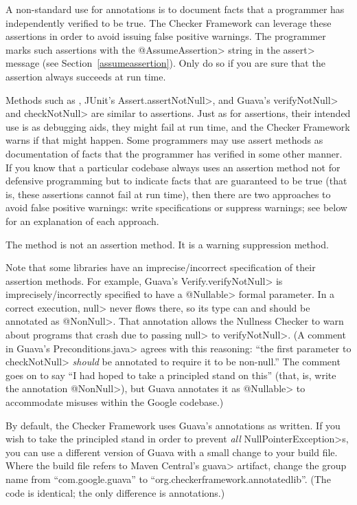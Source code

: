 A non-standard use for annotations is to document facts that a programmer
has independently verified to be true.  The Checker Framework can
leverage these assertions in order to avoid issuing false positive
warnings.  The programmer marks such assertions with the \<@AssumeAssertion>
string in the \<assert> message (see Section~\ref{assumeassertion}).  Only
do so if you are sure that the assertion always succeeds at run time.

\label{assertion-methods}
Methods such as
,
JUnit's \<Assert.assertNotNull>, and
Guava's \<verifyNotNull> and \<checkNotNull> are
similar to assertions.  Just as for assertions, their intended use is as
debugging aids, they might fail at run time, and the Checker Framework
warns if that might happen.
Some programmers may use assert methods as documentation of facts
that the programmer has verified in some other manner.
If you know that a particular codebase always uses
an assertion method not for defensive programming but to indicate
facts that are guaranteed to be true (that is, these assertions cannot
fail at run time), then there are two approaches to avoid false positive
warnings:  write specifications or suppress
warnings; see below for an explanation of each approach.

The method
 is not an
assertion method.  It is a warning suppression method.

Note that some libraries have an imprecise/incorrect specification of their assertion
methods.  For example, Guava's \<Verify.verifyNotNull> is imprecisely/incorrectly
specified to have a \<@Nullable> formal parameter.  In a correct execution,
\<null> never flows there, so its type can and should be annotated as
\<@NonNull>.  That annotation allows the Nullness Checker to warn about
programs that crash due to passing \<null> to \<verifyNotNull>.
(A comment in Guava's \<Preconditions.java> agrees with this reasoning:
``the first parameter to \<checkNotNull> \emph{should} be annotated to
require it to be non-null.''  The comment goes on to say ``I had hoped to
take a principled stand on this'' (that, is, write the annotation
\<@NonNull>), but Guava annotates it as \<@Nullable> to accommodate misuses
within the Google codebase.)

By default, the Checker Framework uses Guava's annotations as written.  If
you wish to  take the principled stand in order to prevent \emph{all}
\<NullPointerException>s, you can
use a different version of Guava with a small change to your build file.  Where the
build file refers to Maven Central's \<guava> artifact, change the group
name from ``com.google.guava'' to ``org.checkerframework.annotatedlib''.
(The code is identical; the only difference is annotations.)


